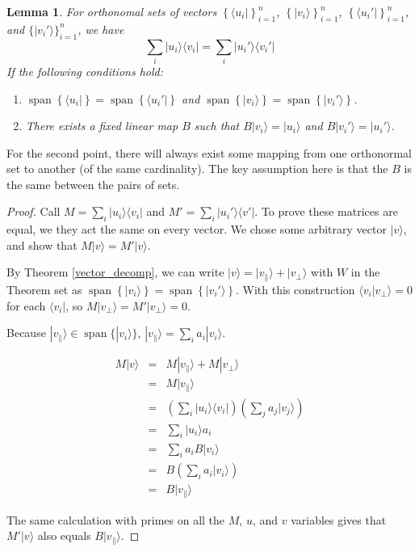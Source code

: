 \documentclass{amsbook}
\newtheorem{lemma}[theorem]{Lemma}
\begin{document}
\begin{lemma}
\label{rebase_projections}
For orthonomal sets of vectors $\left\{\langle u_i|\right\}_{i=1}^n$, $\left\{|v_i\rangle\right\}_{i=1}^n$, $\left\{\langle u_i'|\right\}_{i=1}^n$, and $\{|v_i'\rangle\}_{i=1}^n$, we have
$$
\sum_i|u_i\rangle\langle v_i|=\sum_i|u_i'\rangle\langle v_i'|
$$
If the following conditions hold:
\begin{enumerate}
\item $\operatorname{span}\left\{\langle u_i|\right\}=\operatorname{span}\left\{\langle u_i'|\right\}$ and $\operatorname{span}\left\{|v_i\rangle\right\}=\operatorname{span}\left\{|v_i'\rangle\right\}$.
\item There exists a fixed linear map $B$ such that $B|v_i\rangle=|u_i\rangle$ and $B|v_i'\rangle=|u_i'\rangle$.
\end{enumerate}
\end{lemma}

For the second point, there will always exist some mapping from one orthonormal set to another (of the same cardinality).  The key assumption here is that the $B$ is the same between the pairs of sets.

\begin{proof}
Call $M=\sum_i|u_i\rangle\langle v_i|$ and $M'=\sum_i|u_i'\rangle\langle v'|$.  To prove these matrices are equal, we they act the same on every vector.  We chose some arbitrary vector $|v\rangle$, and show that $M|v\rangle=M'|v\rangle$.

By Theorem \ref{vector_decomp}, we can write $|v\rangle=|v_\parallel\rangle+|v_\bot\rangle$ with $W$ in the Theorem set as $\operatorname{span}\left\{|v_i\rangle\right\}=\operatorname{span}\left\{|v_i'\rangle\right\}$.  With this construction $\langle v_i|v_\bot\rangle=0$ for each $\langle v_i|$, so $M|v_\bot\rangle=M'|v_\bot\rangle=0$.

Because $|v_\parallel\rangle\in\operatorname{span}\{|v_i\rangle\}$, $|v_\parallel\rangle=\sum_ia_i|v_i\rangle$.

$$
\begin{array}{rcl}
M|v\rangle &=& M|v_\parallel\rangle+M|v_\bot\rangle \\
 &=& M|v_\parallel\rangle \\
 &=& \left(\sum_i|u_i\rangle\langle v_i|\right)\left(\sum_ja_j|v_j\rangle\right) \\
 &=& \sum_i|u_i\rangle a_i \\
 &=& \sum_ia_iB|v_i\rangle \\
 &=& B\left(\sum_ia_i|v_i\rangle\right) \\
 &=& B|v_\parallel\rangle
\end{array}
$$

The same calculation with primes on all the $M$, $u$, and $v$ variables gives that $M'|v\rangle$ also equals $B|v_\parallel\rangle$.  
\end{proof}
\end{document}
